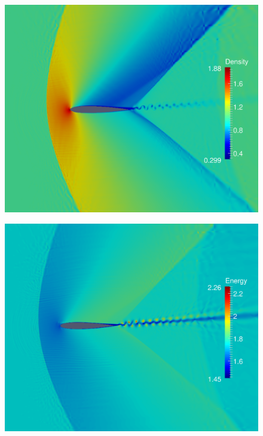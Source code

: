 \begin{figure}
\centering
\begin{minipage}[t]{.5\textwidth}
  \centering
  \includegraphics[width=.85\linewidth]{./figures/density-t1050010-jet.eps}
  \label{fig:visM1pt2-density}
\end{minipage}%
\begin{minipage}[t]{.5\textwidth}
  \centering
  \includegraphics[width=.85\linewidth]{./figures/energy-t1050010-jet.eps}
  \label{fig:visM1pt2-energy}
\end{minipage}
\end{figure} 


